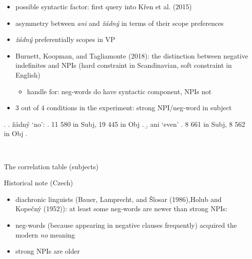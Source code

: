 \documentclass[
  ignorenonframetext,
]{beamer}
\providecommand{\tightlist}{%
  \setlength{\itemsep}{0pt}\setlength{\parskip}{0pt}}\usepackage{longtable,booktabs,array}
\begin{document}
\begin{frame}
\begin{itemize}
\tightlist
\item
  possible syntactic factor: first query into Křen et al. (2015)
\item
  asymmetry between \emph{ani} and \emph{žádný} in terms of their scope
  preferences
\item
  \emph{žádný} preferentially scopes in VP
\item
  Burnett, Koopman, and Tagliamonte (2018): the distinction between
  negative indefinites and NPIs (hard constraint in Scandinavian, soft
  constraint in English)

  \begin{itemize}
  \tightlist
  \item
    handle for: neg-words do have syntactic component, NPIs not
  \end{itemize}
\item
  3 out of 4 conditions in the experiment: strong NPI/neg-word in
  subject
\end{itemize}

\ex. \a. žádný `no': \a. 11 580 in Subj, 19 445 in Obj \z. \b. ani
`even' \a. 8 661 in Subj, 8 562 in Obj \z.

~
\end{frame}

\begin{frame}
\begin{block}{The correlation table (subjects)}
\protect\hypertarget{the-correlation-table-subjects}{}
\tiny
\end{block}
\end{frame}

\begin{frame}
\begin{block}{Historical note (Czech)}
\protect\hypertarget{historical-note-czech}{}
\begin{itemize}
\tightlist
\item
  diachronic linguists (Bauer, Lamprecht, and Šlosar (1986),Holub and
  Kopečný (1952)): at least some neg-words are newer than strong NPIs:
\item
  neg-words (because appearing in negative clauses frequently) acquired
  the modern \emph{no} meaning
\item
  strong NPIs are older
\end{itemize}
\end{block}
\end{frame}
\end{document}
